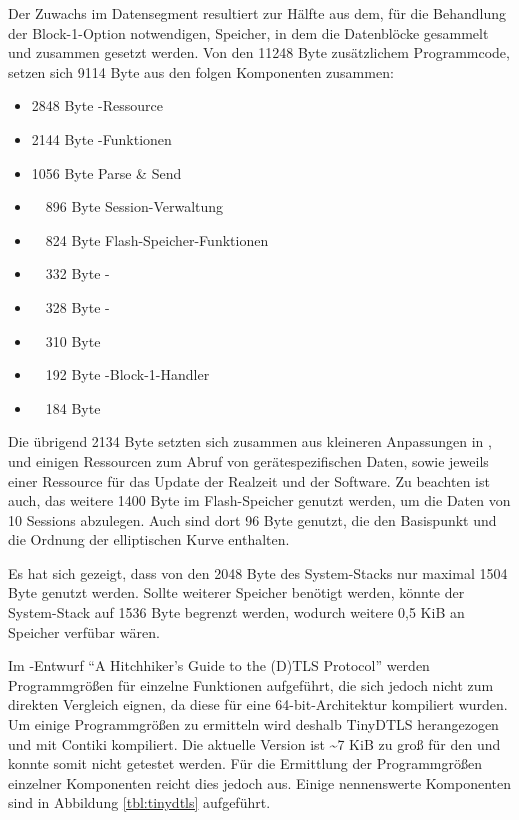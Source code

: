 Der Zuwachs im Datensegment resultiert zur Hälfte aus dem, für die Behandlung der Block-1-Option notwendigen, Speicher, in dem die Datenblöcke gesammelt und
zusammen gesetzt werden. Von den 11248 Byte zusätzlichem Programmcode, setzen sich 9114 Byte aus den folgen Komponenten zusammen:
\begin{itemize}
  \item  2848 Byte -Ressource
  \item  2144 Byte -Funktionen
  \item  1056 Byte Parse \& Send
  \item ~~896 Byte Session-Verwaltung
  \item ~~824 Byte Flash-Speicher-Funktionen
  \item ~~332 Byte -
  \item ~~328 Byte -
  \item ~~310 Byte 
  \item ~~192 Byte -Block-1-Handler
  \item ~~184 Byte 
\end{itemize}
Die übrigend 2134 Byte setzten sich zusammen aus kleineren Anpassungen in , und einigen Ressourcen zum Abruf von gerätespezifischen Daten,
sowie jeweils einer Ressource für das Update der Realzeit und der Software. Zu beachten ist auch, das weitere 1400 Byte im Flash-Speicher genutzt werden,
um die Daten von 10 Sessions abzulegen. Auch sind dort 96 Byte genutzt, die den Basispunkt und die Ordnung der elliptischen Kurve enthalten.

Es hat sich gezeigt, dass von den 2048 Byte des System-Stacks nur maximal 1504 Byte genutzt werden. Sollte weiterer Speicher benötigt werden, könnte
der System-Stack auf 1536 Byte begrenzt werden, wodurch weitere 0,5 KiB an Speicher verfübar wären.

Im -Entwurf "`A Hitchhiker's Guide to the (D)TLS Protocol"' \cite{draftmintls} werden Programmgrößen für einzelne
Funktionen aufgeführt, die sich jedoch nicht zum direkten Vergleich eignen, da diese für eine 64-bit-Architektur kompiliert wurden.
Um einige Programmgrößen zu ermitteln wird deshalb TinyDTLS \cite{tinydtls} herangezogen und mit Contiki kompiliert.
Die aktuelle Version ist \textasciitilde 7 KiB zu groß für den  und konnte somit nicht getestet werden. Für die Ermittlung
der Programmgrößen einzelner Komponenten reicht dies jedoch aus. Einige nennenswerte Komponenten sind in Abbildung \ref{tbl:tinydtls} aufgeführt.

